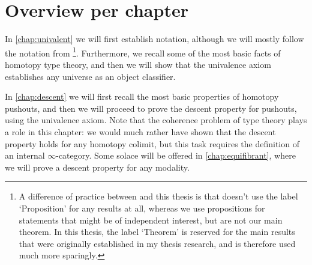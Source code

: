 
\section{Overview per chapter}
In \cref{chap:univalent} we will first establish notation, although we will mostly follow the notation from \cite{hottbook}\footnote{A difference of practice between \cite{hottbook} and this thesis is that \cite{hottbook} doesn't use the label `Proposition' for any results at all, whereas we use propositions for statements that might be of independent interest, but are not our main theorem. In this thesis, the label `Theorem' is reserved for the main results that were originally established in my thesis research, and is therefore used much more sparingly.}. Furthermore, we recall some of the most basic facts of homotopy type theory, and then we will show that the univalence axiom establishes any universe as an object classifier. 

In \cref{chap:descent} we will first recall the most basic properties of homotopy pushouts, and then we will proceed to prove the descent property for pushouts, using the univalence axiom. Note that the coherence problem of type theory plays a role in this chapter: we would much rather have shown that the descent property holds for any homotopy colimit, but this task requires the definition of an internal $\infty$-category. Some solace will be offered in \cref{chap:equifibrant}, where we will prove a descent property for any modality.

